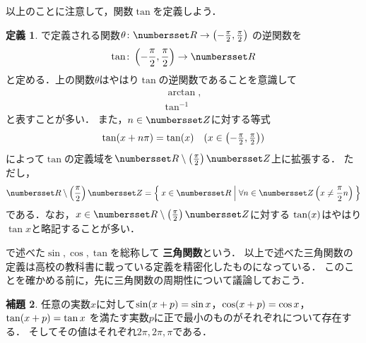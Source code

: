 \documentclass[11pt,a4paper]{ltjsarticle}
\newcommand*{\definition}[1]{\textbf{#1}}
\newcommand*{\inv}[1]{{#1}^{-1}}
\theoremstyle{definition}
\newtheorem{dfn}{定義}[section]
\newtheorem{lemma}[dfn]{補題}
\begin{document}
以上のことに注意して，関数$\tan$を定義しよう．


\begin{dfn} \label{dfn:tan}
  で定義される関数$\theta \colon \Real \to \interval{op}{- \frac{\pi}{2}, \frac{\pi}{2}}$
  の逆関数を
  \begin{align}
    \tan \colon \interval{op}{- \frac{\pi}{2}, \frac{\pi}{2}} \to \Real
    \label{eq:tan}
  \end{align}
  と定める．上の関数$\theta$はやはり$\tan$の逆関数であることを意識して
  \begin{align}
    \arctan,
    \label{eq:arctan} \\
    \inv{\tan}
    \label{eq:invtan}
  \end{align}
  と表すことが多い．
  また，$n \in \Zahlen$に対する等式
  \begin{align}
    \apply{\tan}{x + n \pi} = \apply{\tan}{x} \quad \text{($\textstyle x \in \interval{op}{- \frac{\pi}{2}, \frac{\pi}{2}}$)}
    \label{eq:tanperiod}
  \end{align}
  によって$\tan$の定義域を$\Real \setminus \paren{\frac{\pi}{2}}\Zahlen$上に拡張する．
  ただし，
  \begin{align}
    \Real \setminus \paren{\frac{\pi}{2}} \Zahlen
    = \setintension{x \in \Real}{\forall n \in \Zahlen \paren{x \neq \frac{\pi}{2} n}}
    \label{eq:tandomain}
  \end{align}
  である．なお，$x \in \Real \setminus \paren{\frac{\pi}{2}} \Zahlen$に対する
  $\apply{\tan}{x}$はやはり$\tan x$と略記することが多い．
\end{dfn}



で述べた$\sin , \cos, \tan$を総称して
\definition{三角関数}という．
以上で述べた三角関数の定義は高校の教科書に載っている定義を精密化したものになっている．
このことを確かめる前に，先に三角関数の周期性について議論しておこう．

\begin{lemma} \label{lemma:period}
  任意の実数$x$に対して$\apply{\sin}{x + p} = \sin x$，$\apply{\cos}{x + p} = \cos x$，$\apply{\tan}{x + p} = \tan x$
  を満たす実数$p$に正で最小のものがそれぞれについて存在する．
  そしてその値はそれぞれ$2 \pi, 2 \pi, \pi$である．
\end{lemma}
\end{document}

